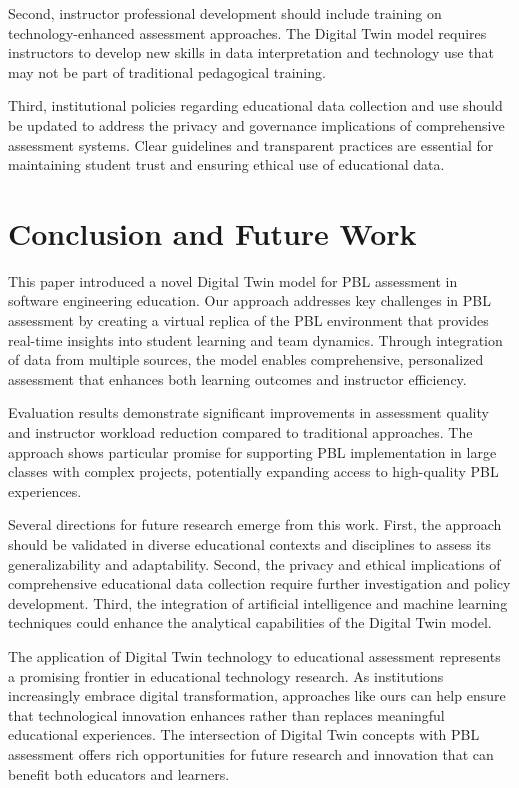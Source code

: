 \documentclass[review]{elsarticle}
\begin{document}
Second, instructor professional development should include training on technology-enhanced assessment approaches. The Digital Twin model requires instructors to develop new skills in data interpretation and technology use that may not be part of traditional pedagogical training.

Third, institutional policies regarding educational data collection and use should be updated to address the privacy and governance implications of comprehensive assessment systems. Clear guidelines and transparent practices are essential for maintaining student trust and ensuring ethical use of educational data.

\section{Conclusion and Future Work}
\label{sec:conclusion}

This paper introduced a novel Digital Twin model for PBL assessment in software engineering education. Our approach addresses key challenges in PBL assessment by creating a virtual replica of the PBL environment that provides real-time insights into student learning and team dynamics. Through integration of data from multiple sources, the model enables comprehensive, personalized assessment that enhances both learning outcomes and instructor efficiency.

Evaluation results demonstrate significant improvements in assessment quality and instructor workload reduction compared to traditional approaches. The approach shows particular promise for supporting PBL implementation in large classes with complex projects, potentially expanding access to high-quality PBL experiences.

Several directions for future research emerge from this work. First, the approach should be validated in diverse educational contexts and disciplines to assess its generalizability and adaptability. Second, the privacy and ethical implications of comprehensive educational data collection require further investigation and policy development. Third, the integration of artificial intelligence and machine learning techniques could enhance the analytical capabilities of the Digital Twin model.

The application of Digital Twin technology to educational assessment represents a promising frontier in educational technology research. As institutions increasingly embrace digital transformation, approaches like ours can help ensure that technological innovation enhances rather than replaces meaningful educational experiences. The intersection of Digital Twin concepts with PBL assessment offers rich opportunities for future research and innovation that can benefit both educators and learners.
\end{document}
